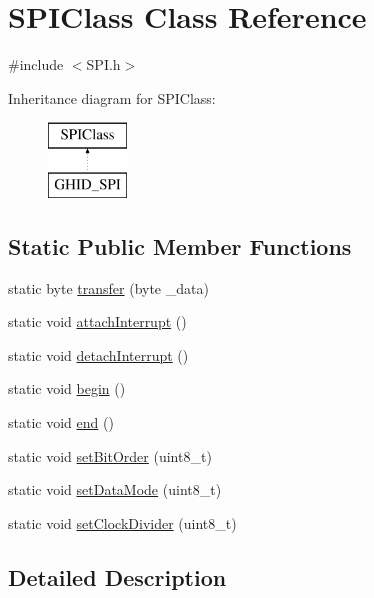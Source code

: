\hypertarget{class_s_p_i_class}{\section{\-S\-P\-I\-Class \-Class \-Reference}
\label{class_s_p_i_class}
}


{\ttfamily \#include $<$\-S\-P\-I.\-h$>$}

\-Inheritance diagram for \-S\-P\-I\-Class\-:\begin{figure}[H]
\begin{center}
\leavevmode
\includegraphics[height=2.000000cm]{class_s_p_i_class}
\end{center}
\end{figure}
\subsection*{\-Static \-Public \-Member \-Functions}
\begin{DoxyCompactItemize}
\item 
static byte \hyperlink{class_s_p_i_class_a821dccd5dda20ccd9093fc35cce74ae5}{transfer} (byte \-\_\-data)
\item 
static void \hyperlink{class_s_p_i_class_a715dff0f3f87dbb64b2ef83d15ee97c0}{attach\-Interrupt} ()
\item 
static void \hyperlink{class_s_p_i_class_abf83d2ea70e46aed0dd278011e1e8741}{detach\-Interrupt} ()
\item 
static void \hyperlink{class_s_p_i_class_a4a2646959a242f6af423b04734c003f0}{begin} ()
\item 
static void \hyperlink{class_s_p_i_class_a79d89d8e3f5f1b003cb7b0aed2d77eab}{end} ()
\item 
static void \hyperlink{class_s_p_i_class_aa50f88614cda319d2d983749b9a7626d}{set\-Bit\-Order} (uint8\-\_\-t)
\item 
static void \hyperlink{class_s_p_i_class_ae7e89ec7f26a6412fb2d218db331195d}{set\-Data\-Mode} (uint8\-\_\-t)
\item 
static void \hyperlink{class_s_p_i_class_ac364a8e46c27d1f6d94a58e9a2455c62}{set\-Clock\-Divider} (uint8\-\_\-t)
\end{DoxyCompactItemize}


\subsection{\-Detailed \-Description}


